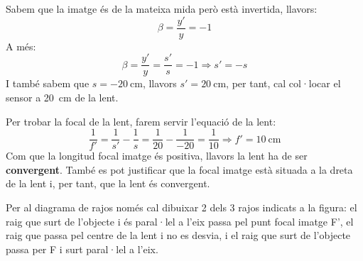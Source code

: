 \begin{solapartat}
 Sabem que la imatge és de la mateixa mida però està invertida, llavors:
\[ \beta = \frac{y'}{y} = -1 \]
A més:
\[ \beta = \frac{y'}{y} = \frac{s'}{s} = -1 \Longrightarrow s' = -s \]
I també sabem que $s = -20\ \mathrm{cm}$, llavors $s' = 20\ \mathrm{cm}$, per tant, cal col·locar el sensor a 20~cm de la lent.

 Per trobar la focal de la lent, farem servir l'equació de la lent:
\[ \frac{1}{f'} = \frac{1}{s'} - \frac{1}{s} = \frac{1}{20} - \frac{1}{-20} = \frac{1}{10} \Longrightarrow f' = 10\ \mathrm{cm} \]
 Com que la longitud focal imatge és positiva, llavors la lent ha de ser \textbf{convergent}. També es pot justificar que la focal imatge està situada a la dreta de la lent i, per tant, que la lent és convergent.
\end{solapartat}

\begin{solapartat}
 Per al diagrama de rajos només cal dibuixar 2 dels 3 rajos indicats a la figura: el raig que surt de l'objecte i és paral·lel a l'eix passa pel punt focal imatge F', el raig que passa pel centre de la lent i no es desvia, i el raig que surt de l'objecte passa per F i surt paral·lel a l'eix.


\end{solapartat}
